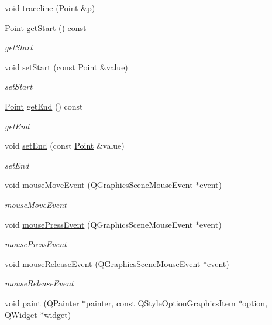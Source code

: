 \begin{DoxyCompactItemize}
\item 
void \mbox{\hyperlink{class_mirror_abac1f72763c81fae43b6524c23577c77}{traceline}} (\mbox{\hyperlink{class_point}{Point}} \&p)
\item 
\mbox{\hyperlink{class_point}{Point}} \mbox{\hyperlink{class_mirror_a960b9dfc0c04975b7b5812fd37d9bb61}{get\+Start}} () const
\begin{DoxyCompactList}\small\item\em get\+Start \end{DoxyCompactList}\item 
void \mbox{\hyperlink{class_mirror_af3b7feed3826bb6e06d69dcee40d73fe}{set\+Start}} (const \mbox{\hyperlink{class_point}{Point}} \&value)
\begin{DoxyCompactList}\small\item\em set\+Start \end{DoxyCompactList}\item 
\mbox{\hyperlink{class_point}{Point}} \mbox{\hyperlink{class_mirror_a4d36cefea10dd1853f1b26ead8f5d484}{get\+End}} () const
\begin{DoxyCompactList}\small\item\em get\+End \end{DoxyCompactList}\item 
void \mbox{\hyperlink{class_mirror_a23b77987f958dd1272f204e4be6e5f75}{set\+End}} (const \mbox{\hyperlink{class_point}{Point}} \&value)
\begin{DoxyCompactList}\small\item\em set\+End \end{DoxyCompactList}\item 
void \mbox{\hyperlink{class_mirror_a01f6bab84d3b879a31c146cfad70d253}{mouse\+Move\+Event}} (Q\+Graphics\+Scene\+Mouse\+Event $\ast$event)
\begin{DoxyCompactList}\small\item\em mouse\+Move\+Event \end{DoxyCompactList}\item 
void \mbox{\hyperlink{class_mirror_ac19e2b03e9ad9657d87b80a76115060f}{mouse\+Press\+Event}} (Q\+Graphics\+Scene\+Mouse\+Event $\ast$event)
\begin{DoxyCompactList}\small\item\em mouse\+Press\+Event \end{DoxyCompactList}\item 
void \mbox{\hyperlink{class_mirror_a21063bba2c74360441c6621c4bc735be}{mouse\+Release\+Event}} (Q\+Graphics\+Scene\+Mouse\+Event $\ast$event)
\begin{DoxyCompactList}\small\item\em mouse\+Release\+Event \end{DoxyCompactList}\item 
void \mbox{\hyperlink{class_mirror_a9c3de9b4d76be5e56442494fd6740773}{paint}} (Q\+Painter $\ast$painter, const Q\+Style\+Option\+Graphics\+Item $\ast$option, Q\+Widget $\ast$widget)
\end{DoxyCompactItemize}
